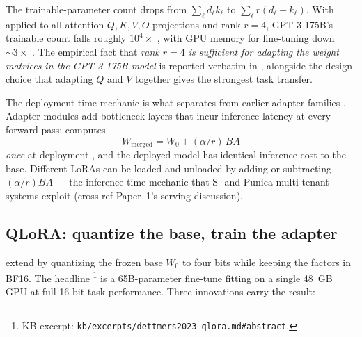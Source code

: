 The trainable-parameter count drops from $\sum_\ell d_\ell k_\ell$ to
$\sum_\ell r(d_\ell + k_\ell)$. With  applied to all attention
$Q, K, V, O$ projections and rank $r = 4$, GPT-3 175B's trainable count
falls roughly $10^{4}\times$ \citep[\S 3]{hu2021-lora}, with GPU memory
for fine-tuning down $\sim\!3\times$ \citep[abstract]{hu2021-lora}. The
empirical fact that \emph{rank $r = 4$ is sufficient for adapting the
weight matrices in the GPT-3 175B model} is reported verbatim in
\citet[\S 4]{hu2021-lora}, alongside the design choice that adapting
$Q$ and $V$ together gives the strongest task transfer.

The deployment-time mechanic is what separates  from earlier
adapter families \citep{houlsby2019-adapters}. Adapter modules add bottleneck layers that incur inference
latency at every forward pass;  computes
\begin{equation}
W_{\text{merged}} = W_0 + (\alpha / r)\, B A
\label{eq:lora-merge}
\end{equation}
\emph{once} at deployment \citep[\S 5]{hu2021-lora}, and the deployed
model has identical inference cost to the base. Different LoRAs can be
loaded and unloaded by adding or subtracting $(\alpha/r) B A$ — the
inference-time mechanic that S- and Punica multi-tenant systems
exploit (cross-ref Paper~1's serving discussion).

\subsection{QLoRA: quantize the base, train the adapter}
\label{sec:adapt-qlora}

\citet{dettmers2023-qlora} extend  by quantizing the frozen base
$W_0$ to four bits while keeping the  factors in BF16. The headline
\citep[abstract]{dettmers2023-qlora}\footnote{KB excerpt:
\nolinkurl{kb/excerpts/dettmers2023-qlora.md#abstract}.} is a 65B-parameter
fine-tune fitting on a single 48~GB GPU at full 16-bit task
performance. Three innovations carry the result:

